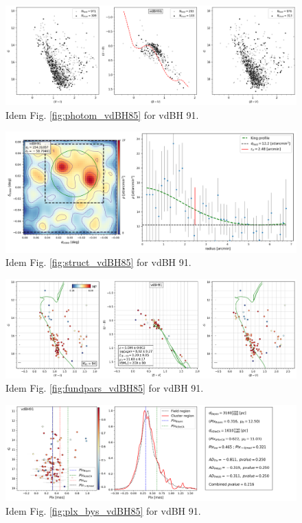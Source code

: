 \documentclass[draft]{aa}
\begin{document}
\begin{figure}[ht]
    \centering
    \includegraphics[width=\hsize]{../figs/obs_vdBH91.png}
    \caption{Idem Fig. \ref{fig:photom_vdBH85} for vdBH 91.}
    \label{fig27}
\end{figure}
\begin{figure}[ht]
    \centering
    \includegraphics[width=\hsize]{../figs/dmap_vdbh91.png}
    \caption{Idem Fig. \ref{fig:struct_vdBH85} for vdBH 91.}
    \label{fig28}
\end{figure}
\begin{figure}[ht]
    \centering
    \includegraphics[width=\hsize]{../figs/cmds_vdBH91.png}
    \caption{Idem Fig. \ref{fig:fundpars_vdBH85} for vdBH 91.}
    \label{fig29}
\end{figure}
\begin{figure}[ht]
    \centering
    \includegraphics[width=\hsize]{../figs/plx_vdBH91.png}
    \caption{Idem Fig. \ref{fig:plx_bys_vdBH85} for vdBH 91.}
    \label{fig30}
\end{figure}
\end{document}
